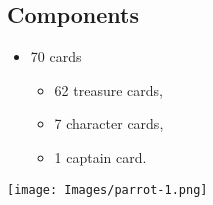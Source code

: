 \begin{multicols}{2}
\section*{Components}
\begin{itemize}[leftmargin=*, nosep]
\item 70 cards
\begin{itemize}[leftmargin=*, nosep]
\item 62 treasure cards,
\item 7 character cards,
\item 1 captain card.
\end{itemize}
\end{itemize}
\vfill{}\null

\begin{center}
\texttt{[image: Images/parrot-1.png]}
\end{center}
\end{multicols}